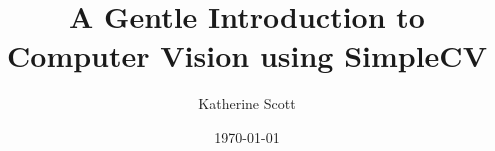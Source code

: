\documentclass[compress]{beamer}
\title[Introduction to SimpleCV]{A Gentle Introduction to
  Computer Vision using SimpleCV} %
\author{Katherine Scott} %
\institute[SightMachine] %
{
SightMachine \\ %
\medskip
\textit{kat@sightmachine.com}
}
\date{\today} %
\begin{document}
\begin{frame}
\titlepage %
\end{frame}



\end{document}
